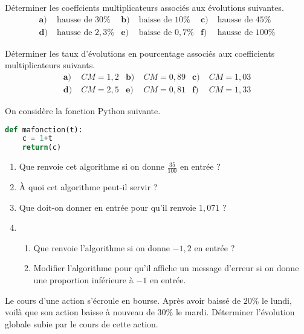 \documentclass[11pt]{article}
\begin{document}
\begin{exo}
Déterminer les coeffcients multiplicateurs associés aux évolutions suivantes.
\begin{align*}
  \textbf{a)}\;& \text{hausse de } 30\% &
  \textbf{b)}\;& \text{baisse de } 10\% &
  \textbf{c)}\;& \text{hausse de } 45\% \\
  \textbf{d)}\;& \text{hausse de } 2,3\% &
  \textbf{e)}\;& \text{baisse de } 0,7\% &
  \textbf{f)}\;& \text{hausse de } 100\%
\end{align*}
\end{exo}

\begin{exo}
Déterminer les taux d'évolutions en pourcentage associés aux coefficients
multiplicateurs suivants.
\begin{align*}
  \textbf{a)}\;& CM=1,2 &
  \textbf{b)}\;& CM = 0,89 &
  \textbf{c)}\;& CM = 1,03 \\
  \textbf{d)}\;& CM = 2,5 &
  \textbf{e)}\;& CM = 0,81 &
  \textbf{f)}\;& CM = 1,33
\end{align*}
\end{exo}

\begin{exo}
On considère la fonction Python suivante.
\begin{lstlisting}[language=Python]
def mafonction(t):
    c = 1+t
    return(c)
\end{lstlisting}
\begin{enumerate}
  \item Que renvoie cet algorithme si on donne $\frac{35}{100}$ en entrée ?
  \item À quoi cet algorithme peut-il servir ?
  \item Que doit-on donner en entrée pour qu'il renvoie $1,071$ ?
  \item \begin{enumerate}
      \item Que renvoie l'algorithme si on donne $-1,2$ en entrée ?
      \item Modifier l'algorithme pour qu'il affiche un message d'erreur si on
        donne une proportion inférieure à $-1$ en entrée.
    \end{enumerate}
\end{enumerate}
\end{exo}

\begin{exo}
Le cours d'une action s'écroule en bourse. Après avoir baissé de $20\%$ le
lundi, voilà que son action baisse à nouveau de $30\%$ le mardi. Déterminer
l'évolution globale subie par le cours de cette action.
\end{exo}
\end{document}
